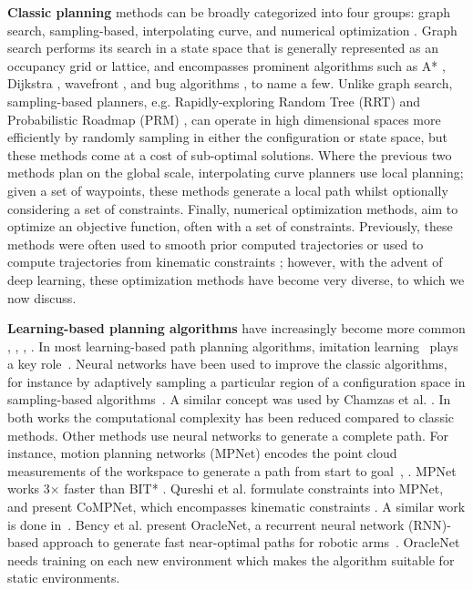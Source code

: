 \documentclass[journal, twocolumn]{IEEEtran}
\begin{document}
\textbf{Classic planning} methods can be broadly categorized into four groups: graph search, sampling-based, interpolating curve, and numerical optimization \cite{gonzalez2016review}. Graph search performs its search in a state space that is generally represented as an occupancy grid or lattice, and encompasses  prominent algorithms such as A* \cite{choset2005principles, duchovn2014path, zhang2014multiple, 5937169}, Dijkstra \cite{choset2005principles, zhang2014multiple}, wavefront \cite{choset2005principles, luo2014effective}, and bug algorithms \cite{choset2005principles, rajko2001pursuit}, to name a few. Unlike graph search, sampling-based planners, e.g. Rapidly-exploring Random Tree (RRT) \cite{lavalle1998rapidly} and Probabilistic Roadmap (PRM) \cite{kavraki1994probabilistic}, can operate in high dimensional spaces more efficiently by randomly sampling in either the configuration or state space, but these methods come at a cost of sub-optimal solutions. Where the previous two methods plan on the global scale, interpolating curve planners \cite{reeds1990optimal, funke2012up, xu2012real} use local planning; given a set of waypoints, these methods generate a local path whilst optionally considering a set of constraints. Finally, numerical optimization methods, aim to optimize an objective function, often with a set of constraints. Previously, these methods were often used to smooth prior computed trajectories \cite{dolgov2010path} or used to compute trajectories from kinematic constraints \cite{ziegler2014making}; however, with the advent of deep learning, these optimization methods have become very diverse, to which we now discuss.

\textbf{Learning-based planning algorithms} have increasingly become more common \cite{Chen2016Humanoids}, 
\cite{gupta2017cognitive}, 
\cite{inoue2019robot}, 
\cite{NeuralRRT}. 
In most learning-based path planning algorithms, 
imitation learning~\cite{ross2011reduction} plays a key role~\cite{TDPPNet}. 
Neural networks have been used to improve the classic algorithms, for instance by adaptively sampling a particular region of a configuration space in sampling-based algorithms~\cite{qureshi2018deeply}. A similar concept was used by Chamzas et al. \cite{chamzas2019using}. In both works the computational complexity has been reduced compared to classic methods. 
%
Other methods use neural networks to generate a complete path. For instance, motion planning networks (MPNet) encodes the point cloud measurements of the workspace to generate a path from start to goal~\cite{qureshi2019motion}, \cite{qureshi2020motion}. MPNet works 3$\times$ faster than BIT* \cite{Bit*}. 
%
Qureshi et al. formulate constraints into MPNet, and present CoMPNet, which encompasses kinematic constraints \cite{CoMPNet}. A similar work is done in~\cite{Johnson_IROS_2020}.
%
%
Bency et al. present OracleNet, a recurrent neural network (RNN)-based approach to generate fast near-optimal paths for robotic arms~\cite{bency2019neural}. OracleNet needs training on each new environment which makes the algorithm suitable for static environments. 
% 
%
\end{document}
